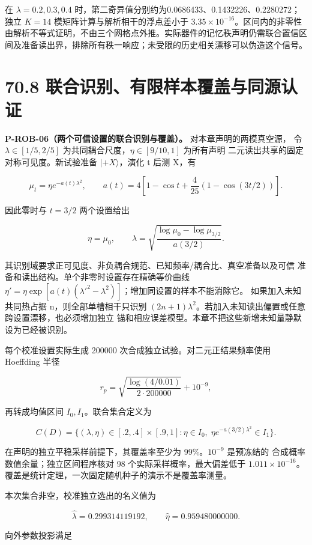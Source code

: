 \documentclass[
  11pt,
  oneside]{book}
\begin{document}
在 \(\lambda=0.2,0.3,0.4\)
时，第二奇异值分别约为0.0686433、0.1432226、0.2280272；独立 \(K=14\)
模矩阵计算与解析相干的浮点差小于
\(3.35\times10^{-16}\)。区间内的非零性由解析不等式证明，不由三个网格点外推。实际器件的记忆秩声明仍需联合置信区间及准备读出界，排除所有秩一响应；未受限的历史相关漂移可以伪造这个信号。

\section{70.8 联合识别、有限样本覆盖与同源认证}

\protect\hypertarget{p-rob-06}{}{}
\textbf{P-ROB-06（两个可信设置的联合识别与覆盖）。}
对本章声明的两模真空源， 令 \(\lambda\in[1/5,2/5]\)
为共同耦合尺度，\(\eta\in[9/10,1]\) 为所有声明
二元读出共享的固定对称可见度。新试验准备 \(|+X\rangle\)，演化 t 后测
X，有

\[
\mu_t=\eta e^{-a(t)\lambda^2},\qquad
a(t)=4\left[1-\cos t+\frac4{25}(1-\cos(3t/2))\right].
\]

因此零时与 \(t=3/2\) 两个设置给出

\[
\eta=\mu_0,\qquad
\lambda=\sqrt{\frac{\log\mu_0-\log\mu_{3/2}}{a(3/2)}}.
\]

其识别域要求正可见度、非负耦合规范、已知频率/耦合比、真空准备以及可信
准备和读出结构。单个非零时设置存在精确等价曲线
\(\eta'=\eta\exp[a(t)(\lambda'^2-\lambda^2)]\)；增加同设置的样本不能消除它。
如果加入未知共同热占据 n，则全部单槽相干只识别
\((2n+1)\lambda^2\)。若加入未知读出偏置或任意跨设置漂移，也必须增加独立
锚和相应误差模型。本章不把这些新增未知量静默设为已经被识别。

每个校准设置实际生成 200000 次合成独立试验。对二元正结果频率使用
Hoeffding 半径

\[
r_p=\sqrt{\frac{\log(4/0.01)}{2\cdot200000}}+10^{-9},
\]

再转成均值区间 \(I_0,I_1\)。联合集合定义为

\[
C(D)=\{(\lambda,\eta)\in[.2,.4]\times[.9,1]:
\eta\in I_0,\;\eta e^{-a(3/2)\lambda^2}\in I_1\}.
\]

在声明的独立平稳采样前提下，其覆盖率至少为 99\%。\(10^{-9}\) 是预冻结的
合成概率数值余量；独立区间程序核对 98 个实际采样概率，最大偏差低于
\(1.011\times10^{-16}\)。覆盖是统计定理，一次固定随机种子的演示不是覆盖率测量。

本次集合非空，校准独立选出的名义值为

\[
\widehat\lambda=0.299314119192,\qquad
\widehat\eta=0.959480000000.
\]

向外参数投影满足
\end{document}
